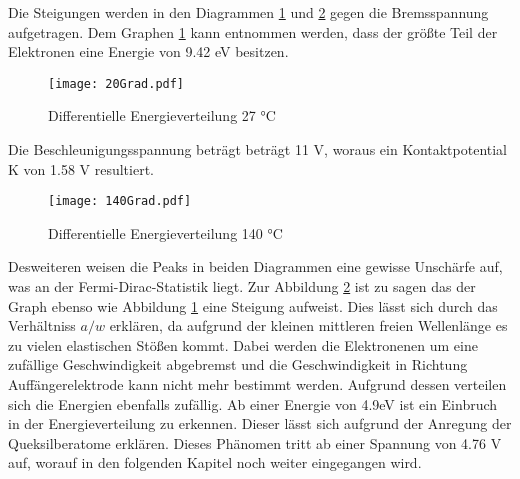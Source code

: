 Die Steigungen werden in den Diagrammen \ref{fig:Energie20} und \ref{fig:Energie140} gegen die Bremsspannung aufgetragen. Dem Graphen \ref{fig:Energie20} kann entnommen werden, dass der größte Teil der Elektronen eine Energie von 9.42 eV besitzen.
\begin{figure}
  \centering
  \texttt{[image: 20Grad.pdf]}
  \caption{Differentielle Energieverteilung 27 °C}
  \label{fig:Energie20}
\end{figure}
Die Beschleunigungsspannung beträgt beträgt 11 V, woraus ein Kontaktpotential K von 1.58 V resultiert.
\begin{figure}
  \centering
  \texttt{[image: 140Grad.pdf]}
  \caption{Differentielle Energieverteilung 140 °C}
  \label{fig:Energie140}
\end{figure}
Desweiteren weisen die Peaks in beiden Diagrammen eine gewisse Unschärfe auf, was an der Fermi-Dirac-Statistik liegt. Zur Abbildung \ref{fig:Energie140} ist zu sagen das der Graph ebenso wie Abbildung \ref{fig:Energie20} eine Steigung aufweist. Dies lässt sich durch das Verhältniss $a/w$ erklären, da aufgrund der kleinen mittleren freien Wellenlänge es zu vielen elastischen Stößen kommt. Dabei werden die Elektronenen um eine zufällige Geschwindigkeit abgebremst und die Geschwindigkeit in Richtung Auffängerelektrode kann nicht mehr bestimmt werden. Aufgrund dessen verteilen sich die Energien ebenfalls zufällig. Ab einer Energie von 4.9eV ist ein Einbruch in der Energieverteilung zu erkennen. Dieser lässt sich aufgrund der Anregung der Queksilberatome erklären. Dieses Phänomen tritt ab einer Spannung von 4.76 V auf, worauf in den folgenden Kapitel noch weiter eingegangen wird.

